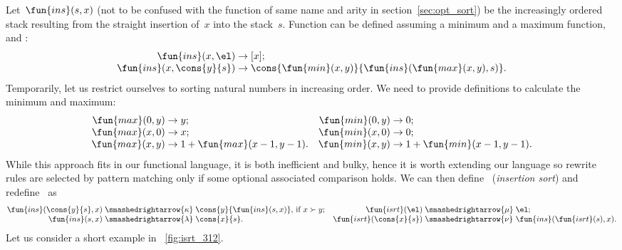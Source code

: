 Let~\(\fun{ins}(s,x)\) (not to be confused with
the function of same name and arity in section~\ref{sec:opt_sort}) be
the increasingly ordered stack resulting from the straight insertion
of~\(x\) into the stack~\(s\). Function  can be defined
assuming a minimum and a maximum function,
 and
:
\begin{equation*}
\begin{array}{@{}r@{\;}l@{\;}l@{}}
\fun{ins}(x,\el) & \rightarrow & [x];\\
\fun{ins}(x,\cons{y}{s}) & \rightarrow &
\cons{\fun{min}(x,y)}{\fun{ins}(\fun{max}(x,y),s)}.
\end{array}
\end{equation*}
Temporarily, let us restrict ourselves to sorting natural numbers in
increasing order. We need to provide definitions to calculate the
minimum and maximum:
\begin{equation*}
\begin{array}{@{}r@{\;}l@{\;}lr@{\;}l@{\;}l@{}}
  \fun{max}(0,y) & \rightarrow & y; & \fun{min}(0,y) & \rightarrow & 0;\\
  \fun{max}(x,0) & \rightarrow & x; & \fun{min}(x,0) & \rightarrow & 0;\\
  \fun{max}(x,y) & \rightarrow & 1 + \fun{max}(x-1,y-1).
& \fun{min}(x,y) & \rightarrow & 1 + \fun{min}(x-1,y-1).
\end{array}
\end{equation*}
While this approach fits in our functional language, it is both
inefficient and bulky, hence it is worth extending our language so
rewrite rules are selected by pattern matching only if some optional
associated comparison holds. We can then
define~ (\emph{insertion sort})
and redefine~ as
\begin{equation*}
\begin{array}{@{}r@{\;}l@{\;}lr@{\;}l@{\;}l@{}}
  \fun{ins}(\cons{y}{s},x)
& \smashedrightarrow{\kappa}
& \cons{y}{\fun{ins}(s,x)}, \,\text{if \(x \succ y\)};
& \fun{isrt}(\el)
& \smashedrightarrow{\mu}
& \el;\\
  \fun{ins}(s,x)
& \smashedrightarrow{\lambda}
& \cons{x}{s}.
& \fun{isrt}(\cons{x}{s})
& \smashedrightarrow{\nu}
& \fun{ins}(\fun{isrt}(s),x).
\end{array}
\end{equation*}
Let us consider a short example in \fig~\vref{fig:isrt_312}.
